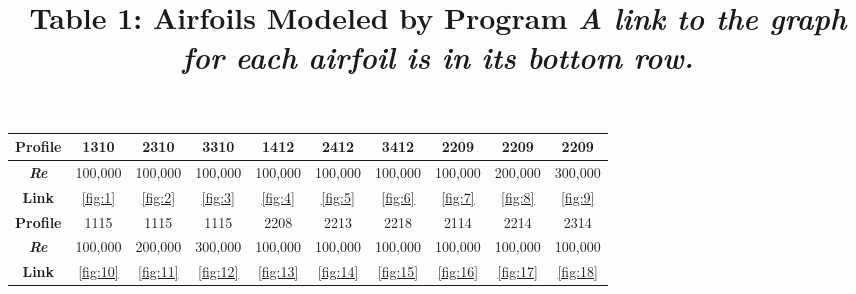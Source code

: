 \documentclass{article}
\begin{document}
\begin{table}[bp]
	\centering
	\title{Table 1: Airfoils Modeled by Program \newline}
	\title{\emph{A link to the graph for each airfoil is in its bottom row.}} \label{table:1}
	\begin{tabular}{ | c | c | c | c | c | c | c | c | c | c |}
		\hline
		 \textbf{Profile} & 1310 & 2310 & 3310 & 1412 & 2412 & 3412 & 2209 & 2209 & 2209 \\ \hline
		 \textbf{\emph{Re}} & 100,000 & 100,000 & 100,000 & 100,000 & 100,000 & 100,000 & 100,000 & 200,000 & 300,000 \\ 
		 \textbf{Link} & \ref{fig:1} & \ref{fig:2} & \ref{fig:3} & \ref{fig:4} & \ref{fig:5} & \ref{fig:6} & \ref{fig:7} & \ref{fig:8} & \ref{fig:9} \\ \hline \hline
		 \newline
		 \textbf{Profile} & 1115 & 1115 & 1115 & 2208 & 2213 & 2218 & 2114 & 2214 & 2314 \\ \hline
		 \textbf{\emph{Re}} & 100,000 & 200,000 & 300,000 & 100,000 & 100,000 & 100,000 & 100,000 & 100,000 & 100,000 \\ 
		 \textbf{Link} & \ref{fig:10} & \ref{fig:11} & \ref{fig:12} & \ref{fig:13} & \ref{fig:14} & \ref{fig:15} & \ref{fig:16} & \ref{fig:17} & \ref{fig:18} \\ \hline
	\end{tabular}
\end{table}
\end{document}
